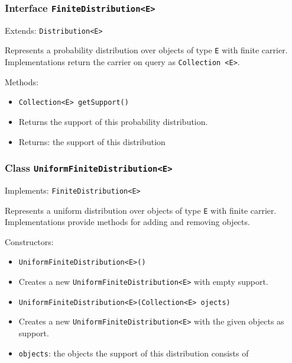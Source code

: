 \documentclass[parskip=full,11pt]{scrartcl}
\begin{document}
\subsubsection{Interface \texttt{FiniteDistribution<E>}}
Extends: \texttt{Distribution<E>}


Represents a probability distribution over objects of type \texttt{E} with finite carrier. Implementations return the carrier on query as \texttt{Collection <E>}.

Methods:
\begin{itemize}\itemsep -10pt
\item \texttt{Collection<E> getSupport()}
\item[] Returns the support of this probability distribution.
\item[] Returns: the support of this distribution
\end{itemize}

\subsubsection{Class \texttt{UniformFiniteDistribution<E>}}
Implements: \texttt{FiniteDistribution<E>}

Represents a uniform distribution over objects of type \texttt{E} with finite carrier. Implementations provide methods for adding and removing objects.

Constructors:
\begin{itemize}\itemsep -10pt
\item \texttt{UniformFiniteDistribution<E>()}
\item[] Creates a new \texttt{UniformFiniteDistribution<E>} with empty support.

\item \texttt{UniformFiniteDistribution<E>(Collection<E> ojects)}
\item[] Creates a new \texttt{UniformFiniteDistribution<E>} with the given objects as support.
\item[] \texttt{objects}: the objects the support of this distribution consists of
\end{itemize}
\end{document}

